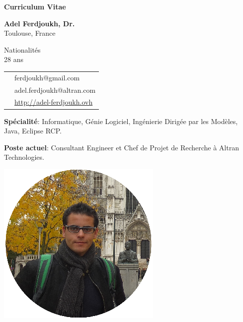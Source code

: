 \thispagestyle{empty}

\renewcommand\refname{~}

\begin{center}
\par\textbf{\huge Curriculum Vitae}
\end{center}

\vspace{.5cm}

\begin{minipage}{0.45\textwidth}
\textbf{Adel Ferdjoukh, Dr.} \\ 
Toulouse, France

\vspace{.3cm}

Nationalités \fr{} \dz{} \kab{} \\
28 ans \\

\begin{tabular}{cl}
\email{} & ferdjoukh@gmail.com\\

\email{} & adel.ferdjoukh@altran.com\\

\web{} & \url{http://adel-ferdjoukh.ovh}\\
\end{tabular}

\medskip
{\bf Spécialité}: Informatique, Génie Logiciel, Ingénierie Dirigée par les Modèles, Java, Eclipse RCP.

\medskip
{\bf Poste actuel}: Consultant Engineer et Chef de Projet de Recherche à Altran Technologies.


\end{minipage}
\hfill
\begin{minipage}{0.45\textwidth}
\begin{flushright}
\includegraphics[scale=0.25]{img/me2.png}~~~~~~~~
\end{flushright}
\end{minipage}


\tair

\sectionline{}
